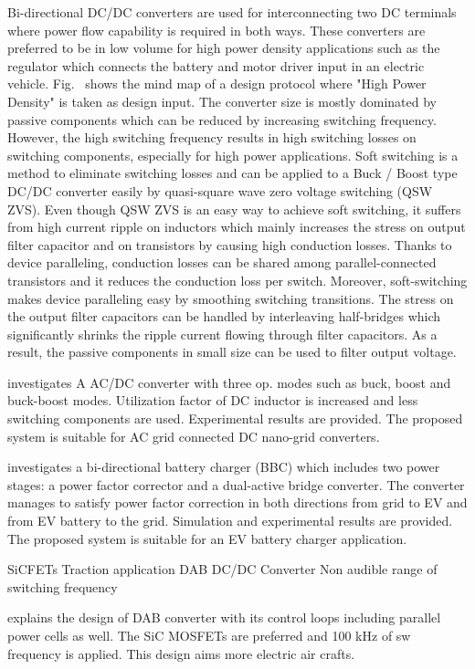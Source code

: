\documentclass[energies,article,submit,moreauthors,pdftex]{Definitions/mdpi}
\begin{document}
Bi-directional DC/DC converters are used for interconnecting two DC terminals where power flow capability is required in both ways. These converters are preferred to be in low volume for high power density applications such as the regulator which connects the battery and motor driver input in an electric vehicle. Fig.~ shows the mind map of a design protocol where "High Power Density" is taken as design input. The converter size is mostly dominated by passive components \cite{Marz2011} which can be reduced by increasing switching frequency. However, the high switching frequency results in high switching losses on switching components, especially for high power applications. Soft switching is a method to eliminate switching losses and can be applied to a Buck / Boost type DC/DC converter easily by quasi-square wave zero voltage switching (QSW ZVS). Even though QSW ZVS is an easy way to achieve soft switching, it suffers from high current ripple on inductors which mainly increases the stress on output filter capacitor and on transistors by causing high conduction losses. Thanks to device paralleling, conduction losses can be shared among parallel-connected transistors and it reduces the conduction loss per switch. Moreover, soft-switching makes device paralleling easy by smoothing switching transitions. The stress on the output filter capacitors can be handled by interleaving half-bridges which significantly shrinks the ripple current flowing through filter capacitors. As a result, the passive components in small size can be used to filter output voltage.

\cite{Li2019} investigates A AC/DC converter with three op. modes such as buck, boost and buck-boost modes. Utilization factor of DC inductor is increased and less switching components are used. Experimental results are provided. The proposed system is suitable for AC grid connected DC nano-grid converters.

\cite{Aiello2020} investigates a bi-directional battery charger (BBC) which includes two power stages: a power factor corrector and a dual-active bridge converter. The converter manages to satisfy power factor correction in both directions from grid to EV and from EV battery to the grid. Simulation and experimental results are provided. The proposed system is suitable for an EV battery charger application.

\cite{Adamowicz2020}
SiCFETs
Traction application
DAB DC/DC Converter
Non audible range of switching frequency

\cite{Lamantia2020} explains the design of DAB converter with its control loops including parallel power cells as well. The SiC MOSFETs are preferred and 100 kHz of sw frequency is applied. This design aims more electric air crafts.
\end{document}
